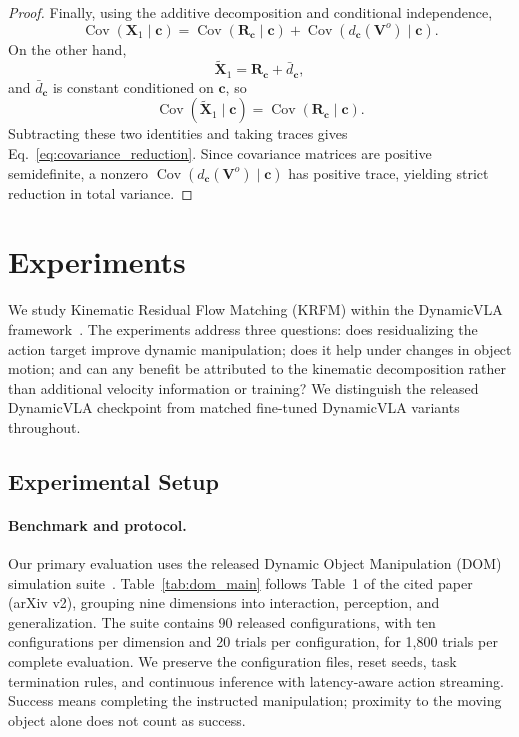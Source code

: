 \documentclass[10pt,twocolumn,letterpaper]{article}
\begin{document}
\begin{proof}
Finally, using the additive decomposition and conditional independence,
\[
    \operatorname{Cov}
    (
        \mathbf X_1
        \mid
        \mathbf c
    )
    =
    \operatorname{Cov}
    (
        \mathbf R_{\mathbf c}
        \mid
        \mathbf c
    )
    +
    \operatorname{Cov}
    (
        d_{\mathbf c}(\mathbf V^{o})
        \mid
        \mathbf c
    ).
\]
On the other hand,
\[
    \widetilde{\mathbf X}_1
    =
    \mathbf R_{\mathbf c}
    +
    \bar d_{\mathbf c},
\]
and $\bar d_{\mathbf c}$ is constant conditioned on $\mathbf c$, so
\[
    \operatorname{Cov}
    (
        \widetilde{\mathbf X}_1
        \mid
        \mathbf c
    )
    =
    \operatorname{Cov}
    (
        \mathbf R_{\mathbf c}
        \mid
        \mathbf c
    ).
\]
Subtracting these two identities and taking traces gives
Eq.~\eqref{eq:covariance_reduction}. Since covariance matrices are positive
semidefinite, a nonzero
$\operatorname{Cov}(d_{\mathbf c}(\mathbf V^{o})\mid\mathbf c)$ has positive
trace, yielding strict reduction in total variance.
\end{proof}


\section{Experiments}
\label{sec:experiments}

We study Kinematic Residual Flow Matching (KRFM) within the DynamicVLA
framework~\citep{xie2026dynamicvla}. The experiments address three questions:
does residualizing the action target improve dynamic manipulation; does it
help under changes in object motion; and can any benefit be attributed to the
kinematic decomposition rather than additional velocity information or training?
We distinguish the released DynamicVLA checkpoint from matched fine-tuned
DynamicVLA variants throughout.

\subsection{Experimental Setup}
\label{sec:exp_setup}

\paragraph{Benchmark and protocol.}
Our primary evaluation uses the released Dynamic Object Manipulation (DOM)
simulation suite~\citep{xie2026dynamicvla}. Table~\ref{tab:dom_main} follows
Table~1 of the cited paper (arXiv v2), grouping nine dimensions into interaction,
perception, and generalization. The suite contains 90 released configurations,
with ten configurations per dimension and 20 trials per configuration, for
1,800 trials per complete evaluation. We preserve the configuration files,
reset seeds, task termination rules, and continuous inference with
latency-aware action streaming. Success means completing the instructed
manipulation; proximity to the moving object alone does not count as success.
\end{document}
